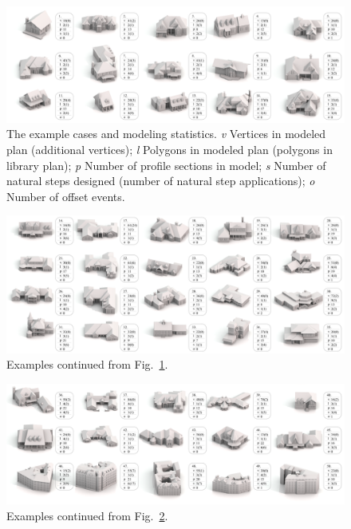 \begin{figure}
\centering
\includegraphics[width=1.0\columnwidth]{13-procex/images/fifty_houses_1}
\caption[Results of interactive evaluation (1)]{\label{fig:fifty_1}The example cases and modeling statistics. \emph{v} Vertices in modeled plan (additional vertices); \emph{l} Polygons in modeled plan (polygons in library plan); \emph{p} Number of profile sections in model; \emph{s} Number of natural steps designed (number of natural step applications); \emph{o} Number of offset events.}
\end{figure}

\begin{figure}
\centering
\includegraphics[width=1.0\columnwidth]{13-procex/images/fifty_houses_2}
\caption[Results of interactive evaluation (2)]{\label{fig:fifty_2}Examples continued from Fig.~\ref{fig:fifty_1}.}
\end{figure}

\begin{figure}
\centering
\includegraphics[width=1.0\columnwidth]{13-procex/images/fifty_houses_3}
\caption[Results of interactive evaluation (3)]{\label{fig:fifty_3}Examples continued from Fig.~\ref{fig:fifty_2}.}
\end{figure}



